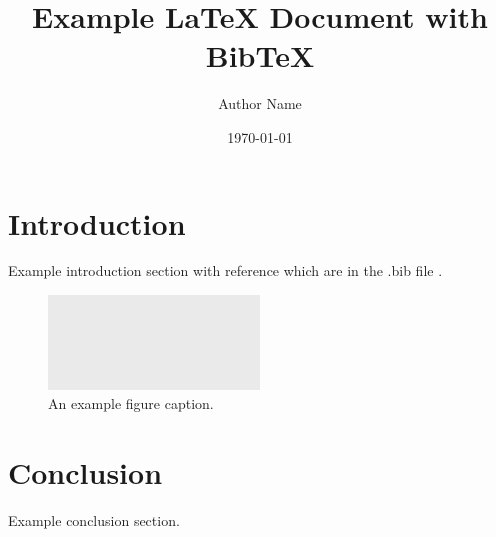 \documentclass[a4paper,11pt,oneside]{article}
\begin{document}
    \title{Example LaTeX Document with BibTeX}
    \author{Author Name}
    \date{\today}

    \maketitle

    \section{Introduction}
    Example introduction section with reference which are in the .bib file \cite{example2025}.

    \begin{figure}[htbp]
        \centering
        \includegraphics[width=0.5\textwidth]{figures/placeholder.png}
        \caption{An example figure caption.}
        \label{fig:example}
    \end{figure}

    \section{Conclusion}
    Example conclusion section.

\end{document}
